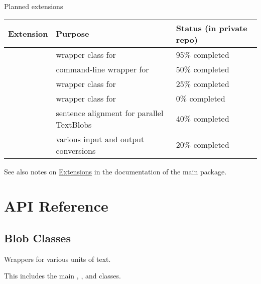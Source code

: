 \documentclass[letterpaper,10pt,english]{sphinxmanual}
\begin{document}
\begin{threeparttable}
\capstart\caption{Planned extensions}

\begin{tabulary}{\linewidth}{|L|L|L|}
\hline
\textsf{\relax 
Extension
} & \textsf{\relax 
Purpose
} & \textsf{\relax 
Status (in private repo)
}\\
\hline
{}
 & 
wrapper class for 
 & 
95\% completed
\\

 & 
command-line wrapper for 
 & 
50\% completed
\\

 & 
wrapper class for 
 & 
25\% completed
\\

 & 
wrapper class for 
 & 
0\% completed
\\

 & 
sentence alignment for parallel TextBlobs
 & 
40\% completed
\\

 & 
various input and output conversions
 & 
20\% completed
\\
\hline\end{tabulary}

\end{threeparttable}


See also notes on \href{http://textblob.readthedocs.org/en/dev/extensions.html}{Extensions}
in the documentation of the main package.


\section{API Reference}
\label{api_reference::doc}\label{api_reference:api-reference}\label{api_reference:api}

\subsection{Blob Classes}
\label{api_reference:blob-classes}\label{api_reference:module-textblob_de.blob}
Wrappers for various units of text.

This includes the main {\hyperref[api_reference:textblob_de.blob.TextBlobDE]{}},
{\hyperref[api_reference:textblob_de.blob.Word]{}}, and {\hyperref[api_reference:textblob_de.blob.WordList]{}} classes.
\end{document}
